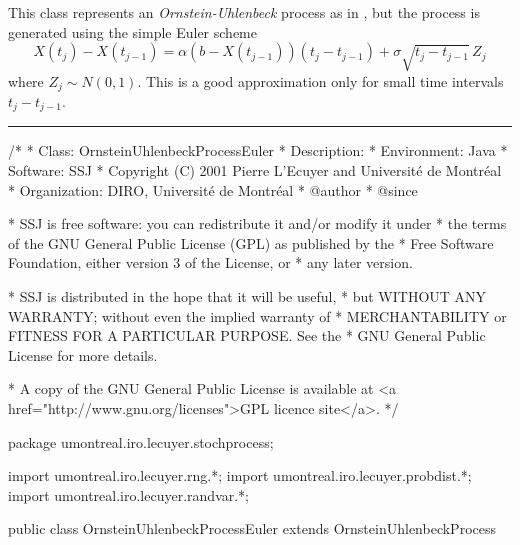
This class represents an \emph{Ornstein-Uhlenbeck} process
as in , but
the process is generated using the simple Euler scheme
\begin{equation}
   X(t_j) - X(t_{j-1}) = \alpha(b - X(t_{j-1}))(t_j - t_{j-1}) +
      \sigma \sqrt{t_j - t_{j-1}}\, Z_j
                                    \label{eq:ornstein-seqEuler}
\end{equation}
where $Z_j \sim N(0,1)$.
This is a good approximation only for small time intervals $t_j - t_{j-1}$.

\bigskip\hrule\bigskip

\begin{code}
\begin{hide}
/*
 * Class:        OrnsteinUhlenbeckProcessEuler
 * Description:  
 * Environment:  Java
 * Software:     SSJ 
 * Copyright (C) 2001  Pierre L'Ecuyer and Université de Montréal
 * Organization: DIRO, Université de Montréal
 * @author       
 * @since

 * SSJ is free software: you can redistribute it and/or modify it under
 * the terms of the GNU General Public License (GPL) as published by the
 * Free Software Foundation, either version 3 of the License, or
 * any later version.

 * SSJ is distributed in the hope that it will be useful,
 * but WITHOUT ANY WARRANTY; without even the implied warranty of
 * MERCHANTABILITY or FITNESS FOR A PARTICULAR PURPOSE.  See the
 * GNU General Public License for more details.

 * A copy of the GNU General Public License is available at
   <a href="http://www.gnu.org/licenses">GPL licence site</a>.
 */
\end{hide}
package umontreal.iro.lecuyer.stochprocess;\begin{hide}
import umontreal.iro.lecuyer.rng.*;
import umontreal.iro.lecuyer.probdist.*;
import umontreal.iro.lecuyer.randvar.*;

\end{hide}

public class OrnsteinUhlenbeckProcessEuler extends OrnsteinUhlenbeckProcess\begin{hide} {
\end{hide}
\end{code}
